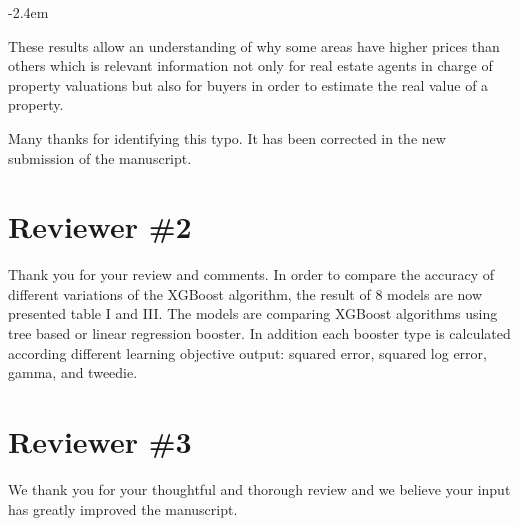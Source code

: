 \documentclass[]{article}
\renewenvironment{quote}{\begin{fquote}\advance\leftmargini -2.4em\begin{oldquote}}{\end{oldquote}\end{fquote}}
\newenvironment{fquote}
  {\def\FrameCommand{
	\fboxsep=0.6em %
	\fcolorbox{black}{white}}%
    \MakeFramed {\advance\hsize-2\width \FrameRestore}
    \begin{minipage}{\linewidth}
  }
  {\end{minipage}\endMakeFramed}
\begin{document}
\begin{quote}
These results allow an understanding of why some areas have higher prices than others which is relevant information not only for real estate agents in charge of property valuations but also for buyers in order to estimate the real value of a property.
\end{quote}


Many thanks for identifying this typo. It has been corrected in the new submission of the manuscript.

\hypertarget{reviewer-2}{%
\section{Reviewer \#2}\label{reviewer-2}}


Thank you for your review and comments. In order to compare the accuracy of different variations of the XGBoost algorithm, the result of 8 models are now presented table I and III. The models are comparing XGBoost algorithms using tree based or linear regression booster. In addition each booster type is calculated according different learning objective output: squared error, squared log error, gamma, and tweedie.

\hypertarget{reviewer-3}{%
\section{Reviewer \#3}\label{reviewer-3}}


We thank you for your thoughtful and thorough review and we believe your input has greatly improved the manuscript.
\end{document}
